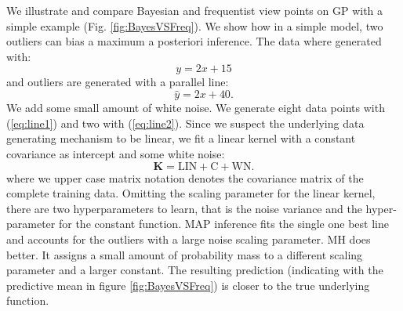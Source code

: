 We illustrate and compare Bayesian and frequentist view points on GP with a simple example (Fig. \ref{fig:BayesVSFreq}). We show how in a simple model, two outliers can bias a maximum a posteriori inference. The data where generated with:
\begin{equation}
\label{eq:line1}
y = 2x + 15
\end{equation}
and outliers are generated with a parallel line:
\begin{equation}
\label{eq:line2}
\hat{y} = 2x + 40.
\end{equation}
We add some small amount of white noise. We generate eight data points with (\ref{eq:line1}) and two with (\ref{eq:line2}). Since we suspect the underlying data generating mechanism to be linear, we fit a linear kernel with a constant covariance as intercept and some white noise:
\begin{equation}
\mathbf{K} = \text{LIN} + \text{C} + \text{WN}.
\end{equation}
where we upper case matrix notation denotes the covariance matrix of the complete training data. Omitting the scaling parameter for the linear kernel, there are two hyperparameters to learn, that is the noise variance and the hyper-parameter for the constant function. \ac{MAP} inference fits the single one best line and accounts for the outliers with a large noise scaling parameter. MH does better. It assigns a small amount of probability mass to a different scaling parameter and a larger constant. The resulting prediction (indicating with the predictive mean in figure \ref{fig:BayesVSFreq}) is closer to the true underlying function.   

